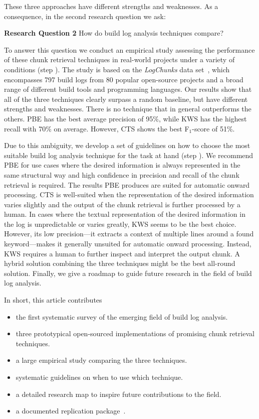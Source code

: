 These three approaches have
different strengths and weaknesses.
As a consequence,
in the second research question we ask:

\begin{simplebox}[minipage boxed title*=-5cm]{\textbf{Research Question
2}}
How do build log analysis techniques compare?
\end{simplebox}

To answer this question
we conduct an empirical study assessing the performance
of these chunk retrieval techniques in
real-world projects under a variety of conditions (step ).
The study is based on the \emph{LogChunks} data
set~\cite{brandt2020logchunks}, which encompasses 797 build logs from
80 popular open-source projects and a broad range of different
build tools and programming languages.
Our results show that all of the three techniques
clearly surpass a random baseline, but have different strengths and
weaknesses.
There is no technique that in general outperforms
the others.
PBE has the best average precision of 95\%, while KWS has the highest
recall with 70\% on average.
However, CTS shows the best F$_{1}$-score
of 51\%.


Due to this ambiguity, we develop a set of guidelines
on how to choose the most suitable build log analysis
technique for the task at hand (step ).
We recommend PBE for use cases where the desired information is always
represented in the same structural way and high confidence in
precision and recall of the chunk retrieval is required.
The results PBE produces are suited for automatic onward processing.
CTS is
well-suited when the representation of the desired information varies
slightly and the output of the chunk retrieval is further processed by
a human.
In cases where the textual representation of the desired
information in the log is unpredictable or varies greatly, KWS seems
to be the best choice.
However, its low precision---it extracts a
context of multiple lines around a found keyword---makes it generally
unsuited for automatic onward processing.
Instead, KWS requires a human
to further inspect and interpret the output chunk.
A hybrid solution combining the three techniques might be the best
all-round solution.
Finally, we give a roadmap to guide future research in the field
of build log analysis.

In short, this article contributes
\begin{itemize}
\item the first systematic survey of the emerging field of build log
analysis.
\item three prototypical open-sourced implementations of
promising chunk retrieval techniques.
\item a large empirical study comparing the three techniques.
\item systematic guidelines on when to use which technique.
\item a detailed research map to inspire future contributions to the
field.
\item a documented replication package~\cite{brandt2020chunk-replication}.
\end{itemize}

